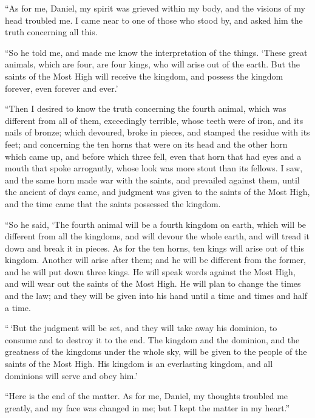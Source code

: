  ``As for me, Daniel, my spirit was grieved within my
body, and the visions of my head troubled me.  I came
near to one of those who stood by, and asked him the truth concerning
all this.

``So he told me, and made me know the interpretation of the things.
 `These great animals, which are four, are four kings,
who will arise out of the earth.  But the saints of the
Most High will receive the kingdom, and possess the kingdom forever,
even forever and ever.'

 ``Then I desired to know the truth concerning the fourth
animal, which was different from all of them, exceedingly terrible,
whose teeth were of iron, and its nails of bronze; which devoured, broke
in pieces, and stamped the residue with its feet;  and
concerning the ten horns that were on its head and the other horn which
came up, and before which three fell, even that horn that had eyes and a
mouth that spoke arrogantly, whose look was more stout than its fellows.
 I saw, and the same horn made war with the saints, and
prevailed against them,  until the ancient of days came,
and judgment was given to the saints of the Most High, and the time came
that the saints possessed the kingdom.

 ``So he said, `The fourth animal will be a fourth
kingdom on earth, which will be different from all the kingdoms, and
will devour the whole earth, and will tread it down and break it in
pieces.  As for the ten horns, ten kings will arise out
of this kingdom. Another will arise after them; and he will be different
from the former, and he will put down three kings.  He
will speak words against the Most High, and will wear out the saints of
the Most High. He will plan to change the times and the law; and they
will be given into his hand until a time and times and half a time.

 ``\,`But the judgment will be set, and they will take
away his dominion, to consume and to destroy it to the end.
 The kingdom and the dominion, and the greatness of the
kingdoms under the whole sky, will be given to the people of the saints
of the Most High. His kingdom is an everlasting kingdom, and all
dominions will serve and obey him.'

 ``Here is the end of the matter. As for me, Daniel, my
thoughts troubled me greatly, and my face was changed in me; but I kept
the matter in my heart.''

